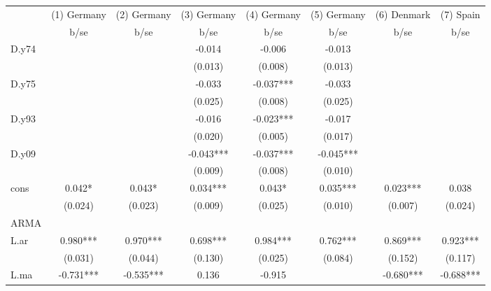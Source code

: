 \begin{tabular}{lccccccc}\toprule
            & (1) Germany   & (2) Germany   & (3) Germany   & (4) Germany   & (5) Germany   & (6) Denmark   &   (7) Spain   \\
            &        b/se   &        b/se   &        b/se   &        b/se   &        b/se   &        b/se   &        b/se   \\
\midrule
D.y74       &               &               &      -0.014   &      -0.006   &      -0.013   &               &               \\
            &               &               &     (0.013)   &     (0.008)   &     (0.013)   &               &               \\
D.y75       &               &               &      -0.033   &      -0.037***&      -0.033   &               &               \\
            &               &               &     (0.025)   &     (0.008)   &     (0.025)   &               &               \\
D.y93       &               &               &      -0.016   &      -0.023***&      -0.017   &               &               \\
            &               &               &     (0.020)   &     (0.005)   &     (0.017)   &               &               \\
D.y09       &               &               &      -0.043***&      -0.037***&      -0.045***&               &               \\
            &               &               &     (0.009)   &     (0.008)   &     (0.010)   &               &               \\
cons        &       0.042*  &       0.043*  &       0.034***&       0.043*  &       0.035***&       0.023***&       0.038   \\
            &     (0.024)   &     (0.023)   &     (0.009)   &     (0.025)   &     (0.010)   &     (0.007)   &     (0.024)   \\
\midrule
ARMA        &               &               &               &               &               &               &               \\
L.ar        &       0.980***&       0.970***&       0.698***&       0.984***&       0.762***&       0.869***&       0.923***\\
            &     (0.031)   &     (0.044)   &     (0.130)   &     (0.025)   &     (0.084)   &     (0.152)   &     (0.117)   \\
L.ma        &      -0.731***&      -0.535***&       0.136   &      -0.915   &               &      -0.680***&      -0.688***\\

\end{tabular}
